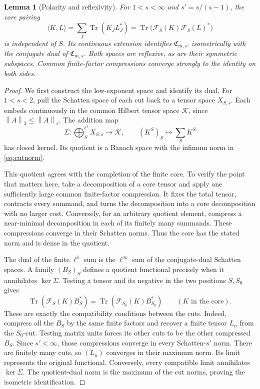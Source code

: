 \documentclass[11pt,a4paper]{amsart}
\numberwithin{equation}{section}
\newtheorem{lemma}[theorem]{Lemma}
\theoremstyle{definition}
\theoremstyle{remark}
\newcommand{\Coeff}{\mathfrak C}
\newcommand{\Flat}{\mathcal F}
\DeclareMathOperator{\Tr}{Tr}
\newcommand{\norm}[1]{\left\lVert#1\right\rVert}
\begin{document}
\begin{lemma}[Polarity and reflexivity]\label{lem:polarity}
For $1<s<\infty$ and $s'=s/(s-1)$, the core pairing
\begin{equation}\label{eq:coeffpair}
 \langle K,L\rangle=\sum_J\Tr(K_JL_J^*)
 =\Tr\big(\Flat_S(K)\Flat_S(L)^*\big)
\end{equation}
is independent of $S$. Its continuous extension identifies $\Coeff_{m,s'}$ isometrically with the conjugate dual of $\Coeff_{m,s}$. Both spaces are reflexive, as are their symmetric subspaces. Common finite-factor compressions converge strongly to the identity on both sides.
\end{lemma}
\begin{proof}
We first construct the low-exponent space and identify its dual. For $1<s<2$, pull the Schatten space of each cut back to a tensor space $X_{S,s}$. Each embeds continuously in the common Hilbert tensor space $\mathscr K$, since $\norm A_2\le\norm A_s$. The addition map
\[
 \Sigma:\bigoplus_S^{\ell^1}X_{S,s}\longrightarrow\mathscr K,
 \qquad (K^S)_S\longmapsto\sum_SK^S
\]
has closed kernel. Its quotient is a Banach space with the infimum norm in \eqref{eq:cutnorm}.

This quotient agrees with the completion of the finite core. To verify the point that matters here, take a decomposition of a core tensor and apply one sufficiently large common finite-factor compression. It fixes the total tensor, contracts every summand, and turns the decomposition into a core decomposition with no larger cost. Conversely, for an arbitrary quotient element, compress a near-minimal decomposition in each of its finitely many summands. These compressions converge in their Schatten norms. Thus the core has the stated norm and is dense in the quotient.

The dual of the finite $\ell^1$ sum is the $\ell^\infty$ sum of the conjugate-dual Schatten spaces. A family $(B_S)_S$ defines a quotient functional precisely when it annihilates $\ker\Sigma$. Testing a tensor and its negative in the two positions $S,S_0$ gives
\[
 \Tr(\Flat_S(K)B_S^*)
 =\Tr(\Flat_{S_0}(K)B_{S_0}^*)
 \qquad(K\text{ in the core}).
\]
These are exactly the compatibility conditions between the cuts. Indeed, compress all the $B_S$ by the same finite factors and recover a finite tensor $L_n$ from the $S_0$-cut. Testing matrix units forces its other cuts to be the other compressed $B_S$. Since $s'<\infty$, those compressions converge in every Schatten-$s'$ norm. There are finitely many cuts, so $(L_n)$ converges in their maximum norm. Its limit represents the original functional. Conversely, every compatible limit annihilates $\ker\Sigma$. The quotient-dual norm is the maximum of the cut norms, proving the isometric identification.


\end{proof}
\end{document}
